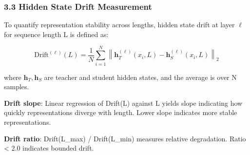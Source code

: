 \subsubsection{3.3 Hidden State Drift Measurement}

To quantify representation stability across lengths, hidden state drift at layer $\ell$ for sequence length L is defined as:

$$\text{Drift}^{(\ell)}(L) = \frac{1}{N} \sum_{i=1}^{N} \left\| \mathbf{h}_T^{(\ell)}(x_i, L) - \mathbf{h}_S^{(\ell)}(x_i, L) \right\|_2$$

where $\mathbf{h}_T, \mathbf{h}_S$ are teacher and student hidden states, and the average is over N samples.

\textbf{Drift slope}: Linear regression of Drift(L) against L yields slope indicating how quickly representations diverge with length. Lower slope indicates more stable representations.

\textbf{Drift ratio}: Drift(L\_max) / Drift(L\_min) measures relative degradation. Ratio < 2.0 indicates bounded drift.

